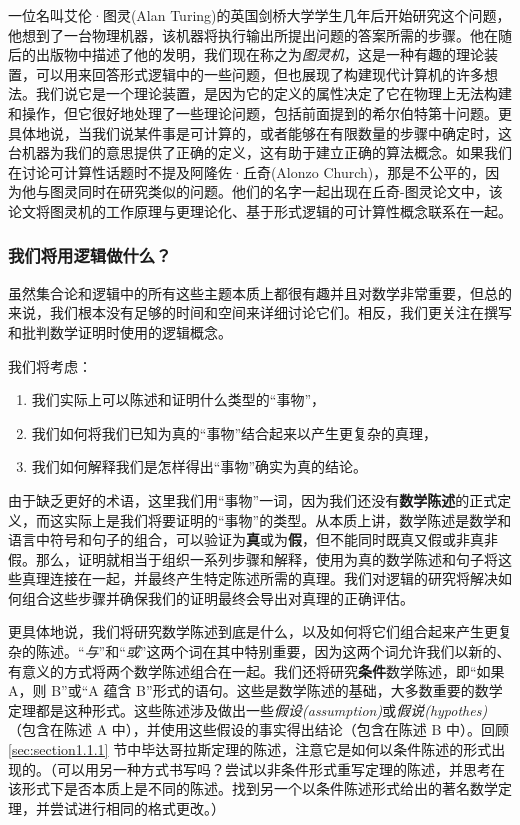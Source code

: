 一位名叫艾伦·图灵(Alan Turing)的英国剑桥大学学生几年后开始研究这个问题，他想到了一台物理机器，该机器将执行输出所提出问题的答案所需的步骤。他在随后的出版物中描述了他的发明，我们现在称之为\emph{图灵机}，这是一种有趣的理论装置，可以用来回答形式逻辑中的一些问题，但也展现了构建现代计算机的许多想法。我们说它是一个理论装置，是因为它的定义的属性决定了它在物理上无法构建和操作，但它很好地处理了一些理论问题，包括前面提到的希尔伯特第十问题。更具体地说，当我们说某件事是可计算的，或者能够在有限数量的步骤中确定时，这台机器为我们的意思提供了正确的定义，这有助于建立正确的算法概念。如果我们在讨论可计算性话题时不提及阿隆佐·丘奇(Alonzo Church)，那是不公平的，因为他与图灵同时在研究类似的问题。他们的名字一起出现在丘奇-图灵论文中，该论文将图灵机的工作原理与更理论化、基于形式逻辑的可计算性概念联系在一起。

\subsubsection*{我们将用逻辑做什么？}

虽然集合论和逻辑中的所有这些主题本质上都很有趣并且对数学非常重要，但总的来说，我们根本没有足够的时间和空间来详细讨论它们。相反，我们更关注在撰写和批判数学证明时使用的逻辑概念。

我们将考虑：

\begin{enumerate}
    \item 我们实际上可以陈述和证明什么类型的``事物''，
    \item 我们如何将我们已知为真的``事物''结合起来以产生更复杂的真理，
    \item 我们如何解释我们是怎样得出``事物''确实为真的结论。
\end{enumerate}

由于缺乏更好的术语，这里我们用``事物''一词，因为我们还没有\textbf{数学陈述}的正式定义，而这实际上是我们将要证明的``事物''的类型。从本质上讲，数学陈述是数学和语言中符号和句子的组合，可以验证为\textbf{真}或为\textbf{假}，但不能同时既真又假或非真非假。那么，证明就相当于组织一系列步骤和解释，使用为真的数学陈述和句子将这些真理连接在一起，并最终产生特定陈述所需的真理。我们对逻辑的研究将解决如何组合这些步骤并确保我们的证明最终会导出对真理的正确评估。

更具体地说，我们将研究数学陈述到底是什么，以及如何将它们组合起来产生更复杂的陈述。``\emph{与}''和``\emph{或}''这两个词在其中特别重要，因为这两个词允许我们以新的、有意义的方式将两个数学陈述组合在一起。我们还将研究\textbf{条件}数学陈述，即``如果 A，则 B''或``A 蕴含 B''形式的语句。这些是数学陈述的基础，大多数重要的数学定理都是这种形式。这些陈述涉及做出一些\emph{假设(assumption)}或\emph{假说(hypothes)}（包含在陈述 A 中），并使用这些假设的事实得出结论（包含在陈述 B 中）。回顾 \ref{sec:section1.1.1} 节中毕达哥拉斯定理的陈述，注意它是如何以条件陈述的形式出现的。（可以用另一种方式书写吗？尝试以非条件形式重写定理的陈述，并思考在该形式下是否本质上是不同的陈述。找到另一个以条件陈述形式给出的著名数学定理，并尝试进行相同的格式更改。）

